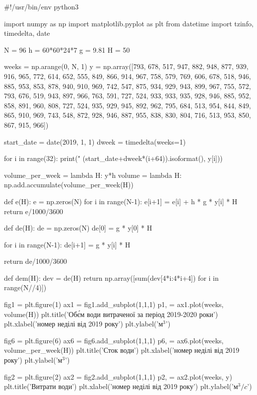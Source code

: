 \documentclass[12pt]{article}
\numberwithin{equation}{section}
\numberwithin{figure}{section}
\begin{document}
\begin{pythoncode}
#!/usr/bin/env python3

import numpy as np
import matplotlib.pyplot as plt
from datetime import tzinfo, timedelta, date

N = 96
h = 60*60*24*7
g = 9.81
H = 50

weeks = np.arange(0, N, 1)
y = np.array([793, 678, 517, 947, 882, 948, 877, 939, 916, 965, 772, 614, 652, 555, 849, 866, 914, 967, 758, 579, 769, 606, 678, 518, 946, 885, 953, 853, 878, 940, 910, 969, 742, 547, 875, 934, 929, 943, 899, 967, 755, 572, 793, 676, 519, 943, 897, 966, 763, 591, 727, 524, 933, 933, 935, 928, 946, 885, 952, 858, 891, 960, 808, 727, 524, 935, 929, 945, 892, 962, 795, 684, 513, 954, 844, 849, 865, 910, 969, 743, 548, 872, 928, 946, 887, 955, 838, 830, 804, 716, 513, 953, 850, 867, 915, 966])

start_date = date(2019, 1, 1)
dweek = timedelta(weeks=1)

for i in range(32):
    print("%
           (start_date+dweek*(i+64)).isoformat(), y[i]))


volume_per_week = lambda H: y*h
volume = lambda H: np.add.accumulate(volume_per_week(H))

def e(H):
    e = np.zeros(N)
    for i in range(N-1):
        e[i+1] = e[i] + h * g * y[i] * H
    return e/1000/3600

def de(H):
    de = np.zeros(N)
    de[0] = g * y[0] * H

    for i in range(N-1):
        de[i+1] = g * y[i] * H
        
    return de/1000/3600
    
def dem(H):
    dev = de(H)
    return np.array([sum(dev[4*i:4*i+4]) for i in range(N//4)])

fig1 = plt.figure(1)
ax1 = fig1.add_subplot(1,1,1)
p1, = ax1.plot(weeks, volume(H))
plt.title('Об\'єм води витраченої за період 2019-2020 роки')
plt.xlabel('номер неділі від 2019 року')
plt.ylabel('$м^3$')

fig6 = plt.figure(6)
ax6 = fig6.add_subplot(1,1,1)
p6, = ax6.plot(weeks, volume_per_week(H))
plt.title('Сток води')
plt.xlabel('номер неділі від 2019 року')
plt.ylabel('$м^3$')

fig2 = plt.figure(2)
ax2 = fig2.add_subplot(1,1,1)
p2, = ax2.plot(weeks, y)
plt.title('Витрати води')
plt.xlabel('номер неділі від 2019 року')
plt.ylabel('$м^3/c$')


\end{pythoncode}
\end{document}
